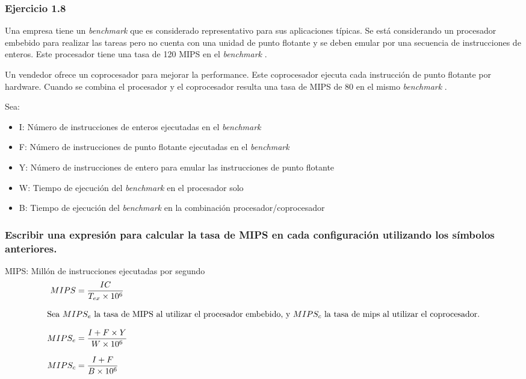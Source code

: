 \documentclass{beamer}
\newcommand{\BMRK}{\textit{benchmark }}
\begin{document}
\beamertemplatenavigationsymbolsempty
\begin{frame}
\frametitle{Ejercicio 1.8}

\begin{footnotesize}
Una empresa tiene un \BMRK que es considerado representativo para sus aplicaciones típicas. 
Se está considerando un procesador embebido para realizar las tareas pero no cuenta con una unidad de punto flotante y 
se deben emular por una secuencia de instrucciones de enteros. Este procesador tiene una tasa de 120 MIPS en el \BMRK.

Un vendedor ofrece un coprocesador para mejorar la performance. Este coprocesador ejecuta cada instrucción de punto 
flotante por hardware. Cuando se combina el procesador y el coprocesador resulta una tasa de MIPS de 80 en el mismo \BMRK.

Sea:
\begin{itemize}
 \item I: Número de instrucciones de enteros ejecutadas en el \BMRK
 \item F: Número de instrucciones de punto flotante ejecutadas en el \BMRK
 \item Y: Número de instrucciones de entero para emular las instrucciones de punto flotante
 \item W: Tiempo de ejecución del \BMRK en el procesador solo
 \item B: Tiempo de ejecución del \BMRK en la combinación procesador/coprocesador
\end{itemize}
\end{footnotesize}
\end{frame}

\begin{frame}
\frametitle{ 
Escribir una expresión para calcular la tasa de MIPS en cada configuración utilizando los símbolos anteriores.
}

MIPS: Millón  de instrucciones ejecutadas por segundo \\
\medskip
\begin{equation}\label{eqA}
\setlength{\jot}{10pt}
\begin{split}
MIPS &= \frac{IC}{T_{ex} \times 10^{6}} \\
\intertext{Sea $MIPS_{e}$ la tasa de MIPS al utilizar el procesador embebido, y $MIPS_{c}$ la tasa de mips al utilizar
el coprocesador.}
MIPS_{e} &= \frac{I + F \times Y}{W \times 10^6} \\
MIPS_{c} &= \frac{I + F}{B \times 10^6}
\end{split}
\end{equation}
\end{frame}
\end{document}
